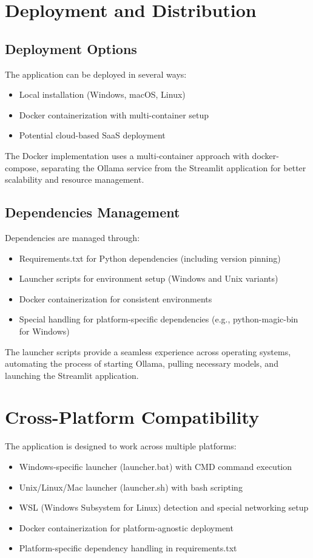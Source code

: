 \documentclass{article}
\begin{document}
\section{Deployment and Distribution}

\subsection{Deployment Options}
The application can be deployed in several ways:
\begin{itemize}
    \item Local installation (Windows, macOS, Linux)
    \item Docker containerization with multi-container setup
    \item Potential cloud-based SaaS deployment
\end{itemize}

The Docker implementation uses a multi-container approach with docker-compose, separating the Ollama service from the Streamlit application for better scalability and resource management.

\subsection{Dependencies Management}
Dependencies are managed through:
\begin{itemize}
    \item Requirements.txt for Python dependencies (including version pinning)
    \item Launcher scripts for environment setup (Windows and Unix variants)
    \item Docker containerization for consistent environments
    \item Special handling for platform-specific dependencies (e.g., python-magic-bin for Windows)
\end{itemize}

The launcher scripts provide a seamless experience across operating systems, automating the process of starting Ollama, pulling necessary models, and launching the Streamlit application.

\section{Cross-Platform Compatibility}
The application is designed to work across multiple platforms:
\begin{itemize}
    \item Windows-specific launcher (launcher.bat) with CMD command execution
    \item Unix/Linux/Mac launcher (launcher.sh) with bash scripting
    \item WSL (Windows Subsystem for Linux) detection and special networking setup
    \item Docker containerization for platform-agnostic deployment
    \item Platform-specific dependency handling in requirements.txt
\end{itemize}
\end{document}
